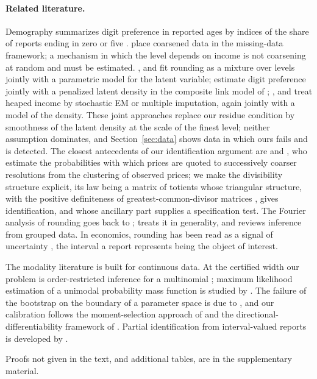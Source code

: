 \paragraph{Related literature.}
Demography summarizes digit preference in reported ages by indices of the share of reports ending in zero or five \citep{Whipple1919,Myers1940,AHearnBatenCrayen2009}. \citet{HeitjanRubin1990,HeitjanRubin1991} place coarsened data in the missing-data framework; a mechanism in which the level depends on income is not coarsening at random and must be estimated. \citet{WrightBray2003}, \citet{WangHeitjan2008} and \citet{BarLillard2012} fit rounding as a mixture over levels jointly with a parametric model for the latent variable; \citet{CamardaEilersGampe2008} estimate digit preference jointly with a penalized latent density in the composite link model of \citet{Eilers2007}; \citet{GrossRendtel2016}, \citet{ZinnWurbach2016} and \citet{DrechslerKiesl2016} treat heaped income by stochastic EM or multiple imputation, again jointly with a model of the density. These joint approaches replace our residue condition by smoothness of the latent density at the scale of the finest level; neither assumption dominates, and Section~\ref{sec:data} shows data in which ours fails and is detected. The closest antecedents of our identification argument are \citet{BallTorousTschoegl1985} and \citet{Harris1991}, who estimate the probabilities with which prices are quoted to successively coarser resolutions from the clustering of observed prices; we make the divisibility structure explicit, its law being a matrix of totients whose triangular structure, with the positive definiteness of greatest-common-divisor matrices \citep{Smith1875,BeslinLigh1989}, gives identification, and whose ancillary part supplies a specification test. The Fourier analysis of rounding goes back to \citet{Sheppard1898}; \citet{Janson2006} treats it in generality, and \citet{Heitjan1989} reviews inference from grouped data. In economics, rounding has been read as a signal of uncertainty \citep{ManskiMolinari2010,KleinjansVanSoest2014,RuudSchunkWinter2014,Binder2017}, the interval a report represents being the object of interest.

The modality literature \citep{Silverman1981,HartiganHartigan1985,MullerSawitzki1991,ChengHall1998,HallYork2001,FisherMarron2001,DumbgenWalther2008,AmeijeirasAlonsoCRC2019} is built for continuous data. At the certified width our problem is order-restricted inference for a multinomial \citep{RobertsonWrightDykstra1988,SilvapulleSen2005}; maximum likelihood estimation of a unimodal probability mass function is studied by \citet{BalabdaouiJankowski2016}. The failure of the bootstrap on the boundary of a parameter space is due to \citet{Andrews2000}, and our calibration follows the moment-selection approach of \citet{AndrewsSoares2010} and the directional-differentiability framework of \citet{FangSantos2019}. Partial identification from interval-valued reports is developed by \citet{ManskiTamer2002}.

Proofs not given in the text, and additional tables, are in the supplementary material.
